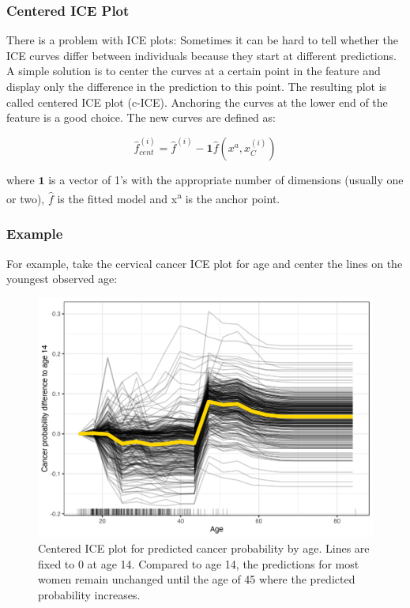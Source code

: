 \documentclass[
  12pt,
]{krantz}
\begin{document}
\hypertarget{centered-ice-plot}{%
\subsubsection{Centered ICE Plot}\label{centered-ice-plot}}

There is a problem with ICE plots:
Sometimes it can be hard to tell whether the ICE curves differ between individuals because they start at different predictions.
A simple solution is to center the curves at a certain point in the feature and display only the difference in the prediction to this point.
The resulting plot is called centered ICE plot (c-ICE).
Anchoring the curves at the lower end of the feature is a good choice.
The new curves are defined as:

\[\hat{f}_{cent}^{(i)}=\hat{f}^{(i)}-\mathbf{1}\hat{f}(x^{a},x^{(i)}_{C})\]

where \(\mathbf{1}\) is a vector of 1's with the appropriate number of dimensions (usually one or two), \(\hat{f}\) is the fitted model and x\textsuperscript{a} is the anchor point.

\hypertarget{example-4}{%
\subsubsection{Example}\label{example-4}}

For example, take the cervical cancer ICE plot for age and center the lines on the youngest observed age:

\begin{figure}

{\centering \includegraphics[width=\textwidth]{images/ice-cervical-centered-1} 

}

\caption{Centered ICE plot for predicted  cancer probability by age. Lines are fixed to 0 at age 14. Compared to age 14, the predictions for most women remain unchanged until the age of 45 where the predicted probability increases.}\label{fig:ice-cervical-centered}
\end{figure}
\end{document}
